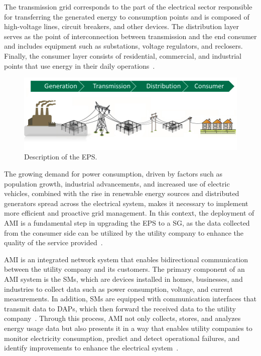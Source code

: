 \documentclass[a4paper,fleqn]{cas-dc}
\begin{document}
The transmission grid corresponds to the part of the electrical sector responsible for transferring the generated energy to consumption points and is composed of high-voltage lines, circuit breakers, and other devices. The distribution layer serves as the point of interconnection between transmission and the end consumer and includes equipment such as substations, voltage regulators, and reclosers. Finally, the consumer layer consists of residential, commercial, and industrial points that use energy in their daily operations~\cite{ufa2022review}.

\begin{figure}[ht]
    \centering
    \includegraphics[width=0.98\linewidth]{imgs/grid1.jpg}
    \caption{Description of the \gls{EPS}.}
    \label{fig:grid}
\end{figure}

The growing demand for power consumption, driven by factors such as population growth, industrial advancements, and increased use of electric vehicles, combined with the rise in renewable energy sources and distributed generators spread across the electrical system, makes it necessary to implement more efficient and proactive grid management. In this context, the deployment of \gls{AMI} is a fundamental step in upgrading the \gls{EPS} to a SG, as the data collected from the consumer side can be utilized by the utility company to enhance the quality of the service provided~\cite{das2022quality}.

\gls{AMI} is an integrated network system that enables bidirectional communication between the utility company and its customers. The primary component of an \gls{AMI} system is the \gls{SMs}, which are devices installed in homes, businesses, and industries to collect data such as power consumption, voltage, and current measurements. In addition, \gls{SMs} are equipped with communication interfaces that transmit data to \gls{DAPs}, which then forward the received data to the utility company~\cite{kabalci2020smart}. Through this process, \gls{AMI} not only collects, stores, and analyzes energy usage data but also presents it in a way that enables utility companies to monitor electricity consumption, predict and detect operational failures, and identify improvements to enhance the electrical system~\cite{nashiruddin2021LoRa}.
\end{document}
